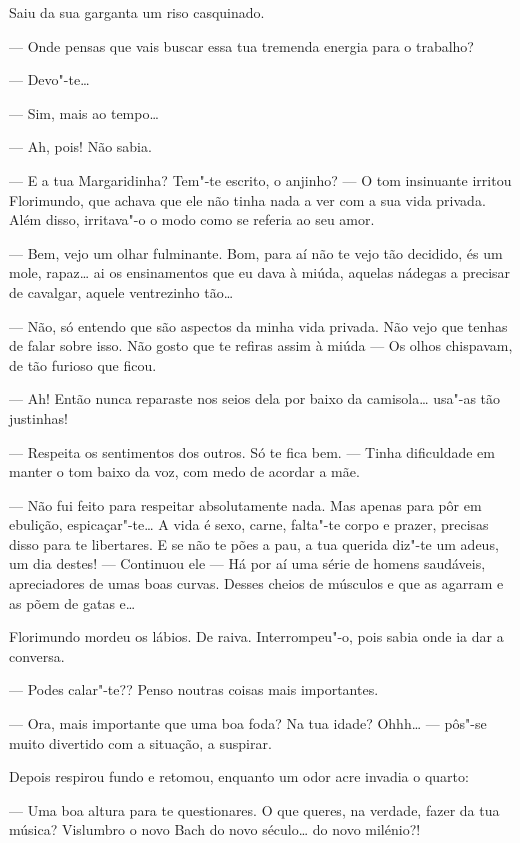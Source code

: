 Saiu da sua garganta um riso casquinado.

--- Onde pensas que vais buscar essa tua tremenda energia para o trabalho?

--- Devo"-te\ldots{}

--- Sim, mais ao tempo\ldots{}

--- Ah, pois! Não sabia.

--- E a tua Margaridinha? Tem"-te escrito, o anjinho? --- O tom insinuante
irritou Florimundo, que achava que ele não tinha nada a ver com a sua
vida privada. Além disso, irritava"-o o modo como se referia ao seu amor.

--- Bem, vejo um olhar fulminante. Bom, para aí não te vejo tão decidido,
és um mole, rapaz\ldots{} ai os ensinamentos que eu dava à miúda, aquelas
nádegas a precisar de cavalgar, aquele ventrezinho tão\ldots{}

--- Não, só entendo que são aspectos da minha vida privada. Não vejo que
tenhas de falar sobre isso. Não gosto que te refiras assim à miúda ---  Os
olhos chispavam, de tão furioso que ficou.

--- Ah! Então nunca reparaste nos seios dela por baixo da
camisola\ldots{} usa"-as tão justinhas!

--- Respeita os sentimentos dos outros. Só te fica bem. ---  Tinha
dificuldade em manter o tom baixo da voz, com medo de acordar a mãe.

--- Não fui feito para respeitar absolutamente nada. Mas apenas para pôr
em ebulição, espicaçar"-te\ldots{} A vida é sexo, carne, falta"-te corpo e
prazer, precisas disso para te libertares. E se não te pões a pau, a tua
querida diz"-te um adeus, um dia destes! --- Continuou ele --- Há por aí uma
série de homens saudáveis, apreciadores de umas boas curvas. Desses
cheios de músculos e que as agarram e as põem de gatas e\ldots{}

Florimundo mordeu os lábios. De raiva. Interrompeu"-o, pois sabia onde ia
dar a conversa.

--- Podes calar"-te?? Penso noutras coisas mais importantes.

--- Ora, mais importante que uma boa foda? Na tua idade? Ohhh\ldots{} --- 
pôs"-se muito divertido com a situação, a suspirar.

Depois respirou fundo e retomou, enquanto um odor acre invadia o quarto:

--- Uma boa altura para te questionares. O que queres, na verdade, fazer
da tua música? Vislumbro o novo Bach do novo século\ldots{} do novo milénio?!

